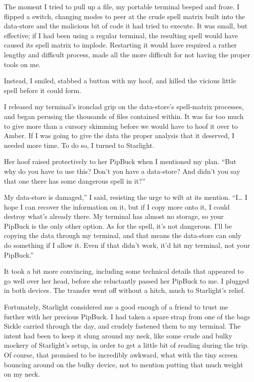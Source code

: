 The moment I tried to pull up a file, my portable terminal beeped and froze. I flipped a switch, changing modes to peer at the crude spell matrix built into the data-store and the malicious bit of code it had tried to execute. It was small, but effective; if I had been using a regular terminal, the resulting spell would have caused its spell matrix to implode. Restarting it would have required a rather lengthy and difficult process, made all the more difficult for not having the proper tools on me.

Instead, I smiled, stabbed a button with my hoof, and killed the vicious little spell before it could form.

I released my terminal’s ironclad grip on the data-store’s spell-matrix processes, and began perusing the thousands of files contained within. It was far too much to give more than a cursory skimming before we would have to hoof it over to Amber. If I was going to give the data the proper analysis that it deserved, I needed more time. To do so, I turned to Starlight.

Her hoof raised protectively to her PipBuck when I mentioned my plan. “But why do you have to use this? Don’t you have a data-store? And didn’t you say that one there has some dangerous spell in it?”

\leavevmode{}My data-store is damaged,” I said, resisting the urge to wilt at its mention. “I… I hope I can recover the information on it, but if I copy more onto it, I could destroy what’s already there. My terminal has almost no storage, so your PipBuck is the only other option. As for the spell, it’s not dangerous. I’ll be copying the data through my terminal, and that means the data-store can only do something if I allow it. Even if that didn’t work, it’d hit my terminal, not your PipBuck.”

It took a bit more convincing, including some technical details that appeared to go well over her head, before she reluctantly passed her PipBuck to me. I plugged in both devices. The transfer went off without a hitch, much to Starlight’s relief.

Fortunately, Starlight considered me a good enough of a friend to trust me further with her precious PipBuck. I had taken a spare strap from one of the bags Sickle carried through the day, and crudely fastened them to my terminal. The intent had been to keep it slung around my neck, like some crude and bulky mockery of Starlight’s setup, in order to get a little bit of reading during the trip. Of course, that promised to be incredibly awkward, what with the tiny screen bouncing around on the bulky device, not to mention putting that much weight on my neck.

